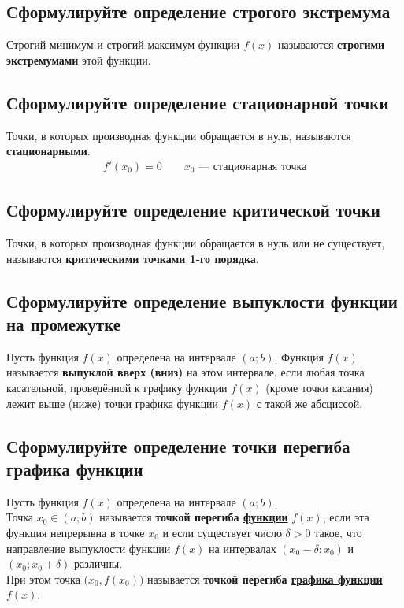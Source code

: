 \subsection{Сформулируйте определение строгого экстремума}
\begin{definition}
    Строгий минимум и строгий максимум функции $f(x)$ называются \textbf{строгими экстремумами} этой функции.
\end{definition}

\subsection{Сформулируйте определение стационарной точки}
\begin{definition}
	Точки, в которых производная функции обращается в нуль, называются \textbf{стационарными}.
	\begin{gather*}
		f'(x_0) = 0\qquad x_0 \text{ --- стационарная точка}
	\end{gather*}
\end{definition}

\subsection{Сформулируйте определение критической точки}
\begin{definition}
	Точки, в которых производная функции обращается в нуль или не существует, называются \textbf{критическими точками 1-го порядка}.
\end{definition}

\subsection{Сформулируйте определение выпуклости функции на промежутке}
\begin{definition}
    Пусть функция $f(x)$ определена на интервале $(a;b)$. Функция $f(x)$ называется \textbf{выпуклой вверх (вниз)} на этом интервале, если любая точка касательной, проведённой к графику функции $f(x)$ (кроме точки касания) лежит выше (ниже) точки графика функции $f(x)$ с такой же абсциссой.
\end{definition}

\subsection{Сформулируйте определение точки перегиба графика функции}
\begin{definition}
    Пусть функция $f(x)$ определена на интервале $(a;b)$.\\
    Точка $x_0 \in (a;b)$ называется \textbf{точкой перегиба \underline{функции}} $f(x)$, если эта функция непрерывна в точке $x_0$ и если существует число $\delta > 0$ такое, что направление выпуклости функции $f(x)$ на интервалах $(x_0 - \delta; x_0)$ и $(x_0; x_0 + \delta)$ различны.\\
    При этом точка $\big(x_0, f(x_0)\big)$ называется \textbf{точкой перегиба \underline{графика функции}} $f(x)$.
\end{definition}
